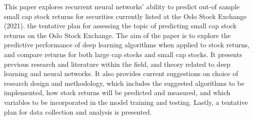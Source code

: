 This paper explores recurrent neural networks' ability to predict out-of sample small cap stock returns for securities currently listed at the Oslo Stock Exchange (2021).   the tentative plan for assessing the topic of predicting small cap stock returns on the Oslo Stock Exchange. The aim of the paper is to explore the predictive performance of deep learning algorithms when applied to stock returns, and compare returns for both large cap stocks and small cap stocks. It presents previous research and literature within the field, and theory related to deep learning and neural networks. It also provides current suggestions on choice of research design and methodology, which includes the suggested algorithms to be implemented, how stock returns will be predicted and measured, and which variables to be incorporated in the model training and testing. Lastly, a tentative plan for data collection and analysis is presented. 